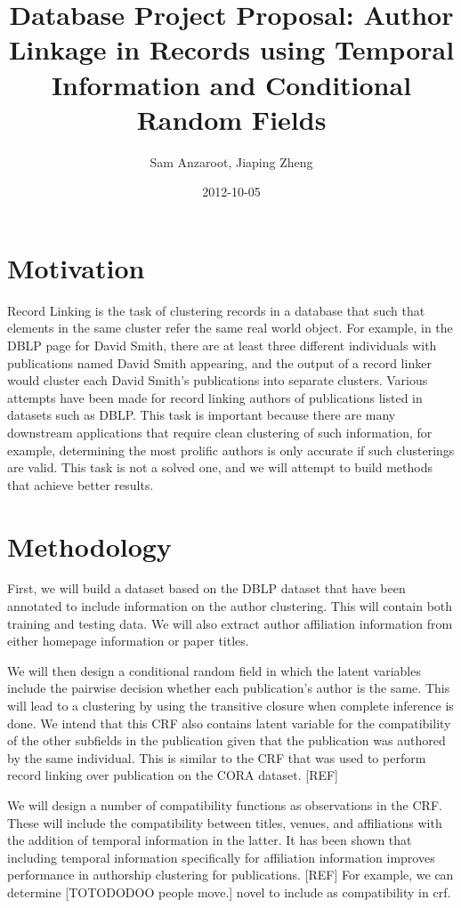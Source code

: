 \documentclass[]{article}
\title{Database Project Proposal: Author Linkage in Records using Temporal Information and Conditional Random Fields}
\author{Sam Anzaroot, Jiaping Zheng}
\date{2012-10-05}
\begin{document}
\ifpdf
{}
\else
{}
\fi

\maketitle

\section{Motivation} %
\label{sec:motivation}
Record Linking is the task of clustering records in a database that such that elements in the same cluster refer the same real world object. For example, in the DBLP page for David Smith, there are at least three different individuals with publications named David Smith appearing, and the output of a record linker would cluster each David Smith's publications into separate clusters. Various attempts have been made for record linking authors of publications listed in datasets such as DBLP. This task is important because there are many downstream applications that require clean clustering of such information, for example, determining the most prolific authors is only accurate if such clusterings are valid. This task is not a solved one, and we will attempt to build methods that achieve better results.

\section{Methodology} %
\label{sec:methodology}
First, we will build a dataset based on the DBLP dataset that have been annotated to include information on the author clustering. This will contain both training and testing data. We will also extract author affiliation information from either homepage information or paper titles. 

We will then design a conditional random field in which the latent variables include the pairwise decision whether each publication's author is the same. This will lead to a clustering by using the transitive closure when complete inference is done. We intend that this CRF also contains latent variable for the compatibility of the other subfields in the publication given that the publication was authored by the same individual. This is similar to the CRF that was used to perform record linking over publication on the CORA dataset. [REF]

We will design a number of compatibility functions as observations in the CRF. These will include the compatibility between titles, venues, and affiliations with the addition of temporal information in the latter. It has been shown that including temporal information specifically for affiliation information improves performance in authorship clustering for publications. [REF] For example, we can determine [TOTODODOO people move.] novel to include as compatibility in crf.
\end{document}
